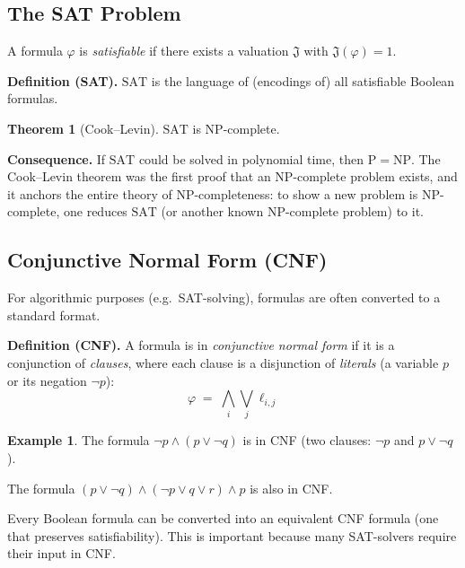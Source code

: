\documentclass[11pt, a4paper]{article}
\theoremstyle{definition}
\newtheorem{example}{Example}[section]
\newtheorem{theorem}{Theorem}[section]
\theoremstyle{remark}
\begin{document}
\subsection{The SAT Problem}

A formula $\varphi$ is \emph{satisfiable} if there exists a valuation $\mathfrak{J}$ with
$\mathfrak{J}(\varphi)=1$.

\begin{defbox}
\textbf{Definition (SAT).}
$\mathrm{SAT}$ is the language of (encodings of) all satisfiable Boolean formulas.
\end{defbox}

\begin{theorem}[Cook--Levin]
$\mathrm{SAT}$ is NP-complete.
\end{theorem}

\begin{insightbox}
\textbf{Consequence.}  If $\mathrm{SAT}$ could be solved in polynomial time, then
$\mathrm{P}=\mathrm{NP}$.  The Cook--Levin theorem was the first proof that an NP-complete
problem exists, and it anchors the entire theory of NP-completeness: to show a new problem
is NP-complete, one reduces $\mathrm{SAT}$ (or another known NP-complete problem) to it.
\end{insightbox}

\subsection{Conjunctive Normal Form (CNF)}

For algorithmic purposes (e.g.\ SAT-solving), formulas are often converted to a standard
format.

\begin{defbox}
\textbf{Definition (CNF).}
A formula is in \emph{conjunctive normal form} if it is a conjunction of \emph{clauses},
where each clause is a disjunction of \emph{literals} (a variable $p$ or its negation
$\lnot p$):
\[
  \varphi \;=\; \bigwedge_i \bigvee_j \ell_{i,j}
\]
\end{defbox}

\begin{example}
The formula $\lnot p\land(p\lor\lnot q)$ is in CNF (two clauses: $\lnot p$ and $p\lor\lnot q$).

The formula $(p\lor\lnot q)\land(\lnot p\lor q\lor r)\land p$ is also in CNF.
\end{example}

Every Boolean formula can be converted into an equivalent CNF formula (one that preserves
satisfiability).  This is important because many SAT-solvers require their input in CNF.
\end{document}
